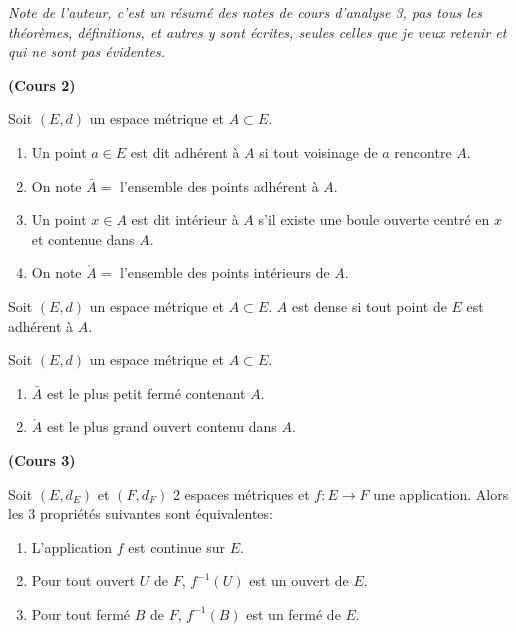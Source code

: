 \documentclass[12pt,a4paper]{article}
\begin{document}
\begin{flushleft}

\textit{Note de l'auteur, c'est un résumé des notes de cours d'analyse 3, pas tous les théorèmes, définitions, et autres y sont écrites, seules celles que je veux retenir et qui ne sont pas évidentes.}\dbs

\textbf{(Cours 2)}

\begin{mydef} 
Soit $(E,d)$ un espace métrique et $A \subset E$.
\begin{enumerate}
\item Un point $a \in E$ est dit adhérent à $A$ si tout voisinage de $a$ rencontre $A$.
\item On note $\bar{A} = $ l'ensemble des points adhérent à $A$.
\item Un point $x \in A$ est dit intérieur à $A$ s'il existe une boule ouverte centré en $x$ et contenue dans $A$.
\item On note $\mathring{A} = $ l'ensemble des points intérieurs de $A$.
\end{enumerate}
\end{mydef}

\begin{mydef}
Soit $(E,d)$ un espace métrique et $A \subset E$. $A$ est dense si tout point de $E$ est adhérent à $A$.
\end{mydef}

\begin{thm} 
Soit $(E,d)$ un espace métrique et $A \subset E$.
\begin{enumerate}
\item $\bar{A}$ est le plus petit fermé contenant $A$.
\item $\mathring{A}$ est le plus grand ouvert contenu dans $A$.
\end{enumerate}
\end{thm}

\textbf{(Cours 3)}

\begin{thm} 
Soit $(E,d_E)$ et $(F,d_F)$ 2 espaces métriques et $f: E \longrightarrow F$ une application. Alors les 3 propriétés suivantes sont équivalentes:
\begin{enumerate}
\item L'application $f$ est continue sur $E$.
\item Pour tout ouvert $U$ de $F$, $ f^{-1} (U) $ est un ouvert de $E$.
\item Pour tout fermé $B$ de $F$, $ f^{-1} (B) $ est un fermé de $E$.
\end{enumerate}
\end{thm}


\end{flushleft}
\end{document}
